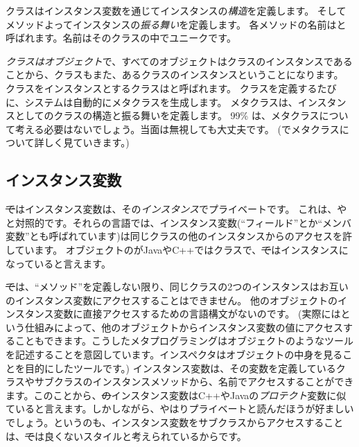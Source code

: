 \documentclass[a4paper,10pt,twoside]{book}
\begin{document}
クラスはインスタンス変数を通じてインスタンスの\emph{構造}を定義します。
そしてメソッドよってインスタンスの\emph{振る舞い}を定義します。
各メソッドの名前はと呼ばれます。名前はそのクラスの中でユニークです。

\emph{クラスはオブジェクト}で、{すべてのオブジェクトはクラスのインスタンスである}ことから、クラスもまた、あるクラスのインスタンスということになります。
クラスをインスタンスとするクラスはと呼ばれます。
クラスを定義するたびに、システムは自動的にメタクラスを生成します。
メタクラスは、インスタンスとしてのクラスの構造と振る舞いを定義します。
99\% は、メタクラスについて考える必要はないでしょう。当面は無視しても大丈夫です。
(でメタクラスについて詳しく見ていきます。)
\subsection{インスタンス変数}

\st ではインスタンス変数は、その\emph{インスタンス}でプライベートです。
これは、やと対照的です。それらの言語では、インスタンス変数(``フィールド''とか``メンバ変数''とも呼ばれています)は同じクラスの他のインスタンスからのアクセスを許しています。
オブジェクトのがJavaやC++ではクラスで、\st ではインスタンスになっていると言えます。


\st では、``メソッド''を定義しない限り、同じクラスの2つのインスタンスはお互いのインスタンス変数にアクセスすることはできません。
他のオブジェクトのインスタンス変数に直接アクセスするための言語構文がないのです。
(実際にはという仕組みによって、他のオブジェクトからインスタンス変数の値にアクセスすることもできます。こうしたメタプログラミングはオブジェクトのようなツールを記述することを意図しています。インスペクタはオブジェクトの中身を見ることを目的にしたツールです。)
インスタンス変数は、その変数を定義しているクラスやサブクラスのインスタンスメソッドから、名前でアクセスすることができます。このことから、\st のインスタンス変数はC++やJavaの\emph{プロテクト}変数に似ていると言えます。しかしながら、やはりプライベートと読んだほうが好ましいでしょう。というのも、インスタンス変数をサブクラスからアクセスすることは、\st では良くないスタイルと考えられているからです。
\end{document}
